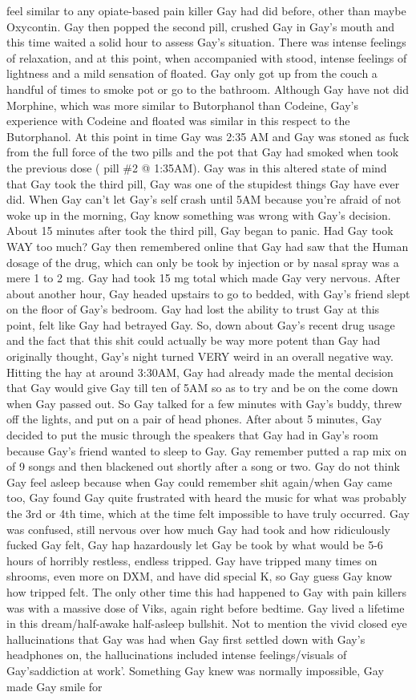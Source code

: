\documentclass[12pt]{book}
\begin{document}
feel similar to any opiate-based pain killer Gay had did before, other than maybe Oxycontin. Gay then popped the second pill, crushed Gay in Gay's mouth and this time waited a solid hour to assess Gay's situation. There was intense feelings of relaxation, and at this point, when accompanied with stood, intense feelings of lightness and a mild sensation of floated. Gay only got up from the couch a handful of times to smoke pot or go to the bathroom. Although Gay have not did Morphine, which was more similar to Butorphanol than Codeine, Gay's experience with Codeine and floated was similar in this respect to the Butorphanol. At this point in time Gay was 2:35 AM and Gay was stoned as fuck from the full force of the two pills and the pot that Gay had smoked when took the previous dose ( pill \#2 @ 1:35AM). Gay was in this altered state of mind that Gay took the third pill, Gay was one of the stupidest things Gay have ever did. When Gay can't let Gay's self crash until 5AM because you're afraid of not woke up in the morning, Gay know something was wrong with Gay's decision. About 15 minutes after took the third pill, Gay began to panic. Had Gay took WAY too much? Gay then remembered online that Gay had saw that the Human dosage of the drug, which can only be took by injection or by nasal spray was a mere 1 to 2 mg. Gay had took 15 mg total which made Gay very nervous. After about another hour, Gay headed upstairs to go to bedded, with Gay's friend slept on the floor of Gay's bedroom. Gay had lost the ability to trust Gay at this point, felt like Gay had betrayed Gay. So, down about Gay's recent drug usage and the fact that this shit could actually be way more potent than Gay had originally thought, Gay's night turned VERY weird in an overall negative way. Hitting the hay at around 3:30AM, Gay had already made the mental decision that Gay would give Gay till ten of 5AM so as to try and be on the come down when Gay passed out. So Gay talked for a few minutes with Gay's buddy, threw off the lights, and put on a pair of head phones. After about 5 minutes, Gay decided to put the music through the speakers that Gay had in Gay's room because Gay's friend wanted to sleep to Gay. Gay remember putted a rap mix on of 9 songs and then blackened out shortly after a song or two. Gay do not think Gay feel asleep because when Gay could remember shit again/when Gay came too, Gay found Gay quite frustrated with heard the music for what was probably the 3rd or 4th time, which at the time felt impossible to have truly occurred. Gay was confused, still nervous over how much Gay had took and how ridiculously fucked Gay felt, Gay hap hazardously let Gay be took by what would be 5-6 hours of horribly restless, endless tripped. Gay have tripped many times on shrooms, even more on DXM, and have did special K, so Gay guess Gay know how tripped felt. The only other time this had happened to Gay with pain killers was with a massive dose of Viks, again right before bedtime. Gay lived a lifetime in this dream/half-awake half-asleep bullshit. Not to mention the vivid closed eye hallucinations that Gay was had when Gay first settled down with Gay's headphones on, the hallucinations included intense feelings/visuals of Gay'saddiction at work'. Something Gay knew was normally impossible, Gay made Gay smile for 
\end{document}
